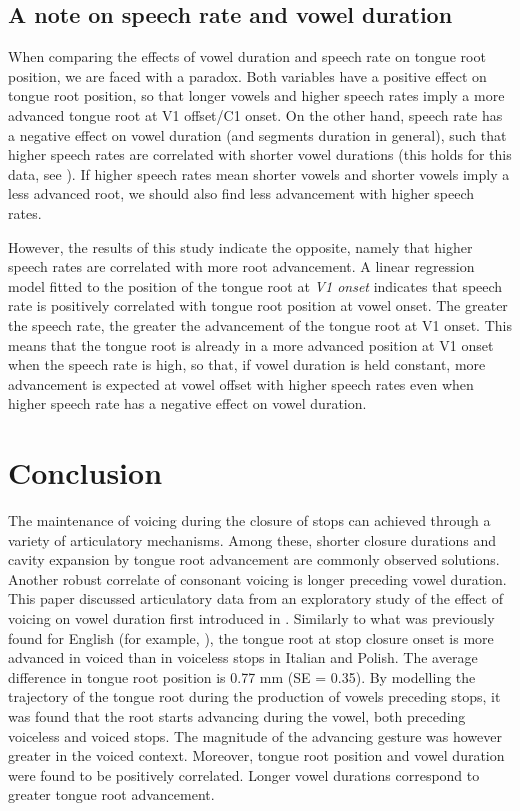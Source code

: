 \documentclass[preprint]{JASAnew}
\begin{document}
\hypertarget{a-note-on-speech-rate-and-vowel-duration}{%
\subsection{A note on speech rate and vowel
duration}\label{a-note-on-speech-rate-and-vowel-duration}}

When comparing the effects of vowel duration and speech rate on tongue
root position, we are faced with a paradox. Both variables have a
positive effect on tongue root position, so that longer vowels and
higher speech rates imply a more advanced tongue root at V1 offset/C1
onset. On the other hand, speech rate has a negative effect on vowel
duration (and segments duration in general), such that higher speech
rates are correlated with shorter vowel durations (this holds for this
data, see \citealt{coretta2018j}). If higher speech rates mean shorter
vowels and shorter vowels imply a less advanced root, we should also
find less advancement with higher speech rates.

However, the results of this study indicate the opposite, namely that
higher speech rates are correlated with more root advancement. A linear
regression model fitted to the position of the tongue root at \emph{V1
onset} indicates that speech rate is positively correlated with tongue
root position at vowel onset. The greater the speech rate, the greater
the advancement of the tongue root at V1 onset. This means that the
tongue root is already in a more advanced position at V1 onset when the
speech rate is high, so that, if vowel duration is held constant, more
advancement is expected at vowel offset with higher speech rates even
when higher speech rate has a negative effect on vowel duration.

\hypertarget{conclusion}{%
\section{Conclusion}\label{conclusion}}

The maintenance of voicing during the closure of stops can achieved
through a variety of articulatory mechanisms. Among these, shorter
closure durations \citep{davis1989} and cavity expansion by tongue root
advancement \citep{westbury1983} are commonly observed solutions.
Another robust correlate of consonant voicing is longer preceding vowel
duration. This paper discussed articulatory data from an exploratory
study of the effect of voicing on vowel duration first introduced in
\citet{coretta2018j}. Similarly to what was previously found for English
(for example, \citealt{westbury1983, ahn2018}), the tongue root at stop
closure onset is more advanced in voiced than in voiceless stops in
Italian and Polish. The average difference in tongue root position is
0.77 mm (SE = 0.35). By modelling the trajectory of the tongue root
during the production of vowels preceding stops, it was found that the
root starts advancing during the vowel, both preceding voiceless and
voiced stops. The magnitude of the advancing gesture was however greater
in the voiced context. Moreover, tongue root position and vowel duration
were found to be positively correlated. Longer vowel durations
correspond to greater tongue root advancement.
\end{document}
